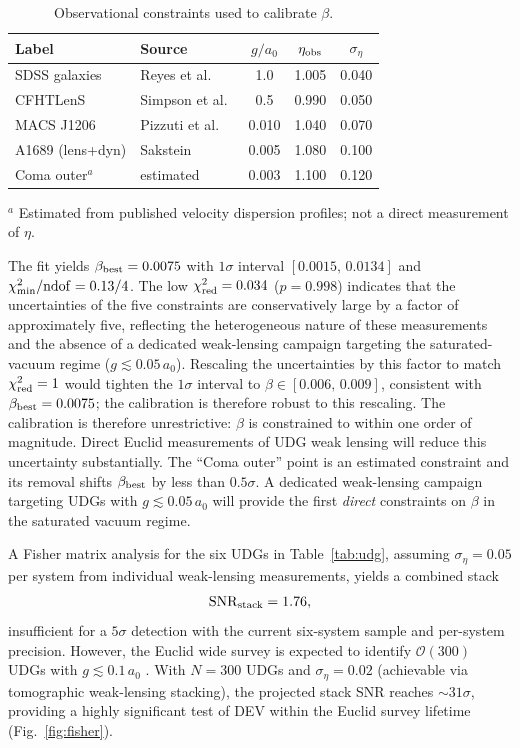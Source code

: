 \documentclass[aps,prd,twocolumn,showpacs,superscriptaddress]{revtex4-2}
\newcommand{\aO}{a_0}
\begin{document}
\begin{table}[h]
\caption{Observational constraints used to calibrate $\beta$.}
\label{tab:beta_constraints}
\begin{ruledtabular}
\begin{tabular}{llccc}
Label & Source & $g/\aO$ & $\eta_{\rm obs}$ & $\sigma_\eta$ \\
\hline
SDSS galaxies    & Reyes et al.~\cite{Reyes2010}   & 1.0   & 1.005 & 0.040 \\
CFHTLenS         & Simpson et al.~\cite{Simpson2013} & 0.5   & 0.990 & 0.050 \\
MACS J1206       & Pizzuti et al.~\cite{Pizzuti2016}& 0.010 & 1.040 & 0.070 \\
A1689 (lens+dyn) & Sakstein~\cite{Sakstein2016}     & 0.005 & 1.080 & 0.100 \\
Coma outer$^a$   & estimated                        & 0.003 & 1.100 & 0.120 \\
\end{tabular}
\end{ruledtabular}
{\small $^a$ Estimated from published velocity dispersion
profiles; not a direct measurement of $\eta$.}
\end{table}

The fit yields $\beta_{\rm best} = 0.0075$ with
$1\sigma$ interval $[0.0015,\, 0.0134]$ and
$\chi^2_{\rm min}/{\rm ndof} = 0.13/4$.
The low $\chi^2_{\rm red} = 0.034$ ($p = 0.998$) indicates
that the uncertainties of the five constraints are
conservatively large by a factor of approximately five,
reflecting the heterogeneous nature of these measurements
and the absence of a dedicated weak-lensing campaign
targeting the saturated-vacuum regime ($g \lesssim 0.05\,\aO$).
Rescaling the uncertainties by this factor to match
$\chi^2_{\rm red} = 1$ would tighten the $1\sigma$ interval to
$\beta \in [0.006,\,0.009]$, consistent with
$\beta_{\rm best} = 0.0075$; the calibration is therefore
robust to this rescaling.
The calibration is therefore unrestrictive: $\beta$ is
constrained to within one order of magnitude. Direct
Euclid measurements of UDG weak lensing will reduce this
uncertainty substantially.
The ``Coma outer'' point is an estimated constraint
and its removal shifts $\beta_{\rm best}$ by less than
$0.5\sigma$.
A dedicated weak-lensing campaign targeting UDGs with
$g \lesssim 0.05\,\aO$ will provide the first
\emph{direct} constraints on $\beta$ in the saturated
vacuum regime.

A Fisher matrix analysis for the six UDGs in Table~\ref{tab:udg},
assuming $\sigma_\eta = 0.05$ per system from individual
weak-lensing measurements, yields a combined stack
\begin{equation}
  \mathrm{SNR}_{\rm stack} = 1.76,
\end{equation}
insufficient for a $5\sigma$ detection with the current
six-system sample and per-system precision.
However, the Euclid wide survey is expected to identify
$\mathcal{O}(300)$ UDGs with $g \lesssim 0.1\,\aO$
\cite{vanDokkum2015}.
With $N=300$ UDGs and $\sigma_\eta=0.02$ (achievable via
tomographic weak-lensing stacking), the projected stack SNR
reaches ${\sim}31\sigma$, providing a highly significant test
of DEV within the Euclid survey lifetime
(Fig.~\ref{fig:fisher}).
\end{document}
